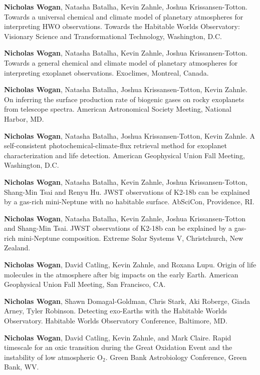 \documentclass[12pt]{article}
\begin{document}
\begin{cvlist}

\item[2025]
  \textbf{Nicholas Wogan}, Natasha Batalha, Kevin Zahnle, Joshua Krissansen-Totton. Towards a universal chemical and climate model of planetary atmospheres for interpreting HWO observations. Towards the Habitable Worlds Observatory: Visionary Science and Transformational Technology, Washington, D.C.
\item[2025]
  \textbf{Nicholas Wogan}, Natasha Batalha, Kevin Zahnle, Joshua Krissansen-Totton. Towards a general chemical and climate model of planetary atmospheres for interpreting exoplanet observations. Exoclimes, Montreal, Canada.
\item[2025]
  \textbf{Nicholas Wogan}, Natasha Batalha, Joshua Krissansen-Totton, Kevin Zahnle. On inferring the surface production rate of biogenic gases on rocky exoplanets from telescope spectra. American Astronomical Society Meeting, National Harbor, MD.
\item[2024]
  \textbf{Nicholas Wogan}, Natasha Batalha, Joshua Krissansen-Totton, Kevin Zahnle. A self-consistent photochemical-climate-flux retrieval method for exoplanet characterization and life detection. American Geophysical Union Fall Meeting, Washington, D.C.
\item[2024]
  \textbf{Nicholas Wogan}, Natasha Batalha, Kevin Zahnle, Joshua Krissansen-Totton, Shang-Min Tsai and Renyu Hu. JWST observations of K2-18b can be explained by a gas-rich mini-Neptune with no habitable surface. AbSciCon, Providence, RI.
\item[2024]
  \textbf{Nicholas Wogan}, Natasha Batalha, Kevin Zahnle, Joshua Krissansen-Totton and Shang-Min Tsai. JWST observations of K2-18b can be explained by a gas-rich mini-Neptune composition. Extreme Solar Systems V, Christchurch, New Zealand.
\item[2023]
  \textbf{Nicholas Wogan}, David Catling, Kevin Zahnle, and Roxana Lupu. Origin of life molecules in the atmosphere after big impacts on the early Earth. American Geophysical Union Fall Meeting, San Francisco, CA.
\item[2023]
  \textbf{Nicholas Wogan}, Shawn Domagal-Goldman, Chris Stark, Aki Roberge, Giada Arney, Tyler Robinson. Detecting exo-Earths with the Habitable Worlds Observatory. Habitable Worlds Observatory Conference, Baltimore, MD.
\item[2023]
  \textbf{Nicholas Wogan}, David Catling, Kevin Zahnle, and Mark Claire. Rapid timescale for an oxic transition during the Great Oxidation Event and the instability of low atmospheric O$_2$. Green Bank Astrobiology Conference, Green Bank, WV.

\end{cvlist}
\end{document}
